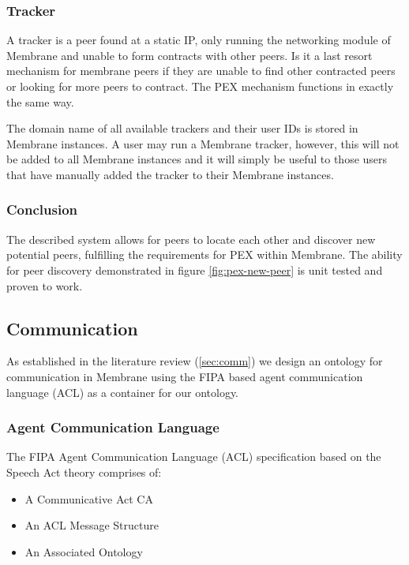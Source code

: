 \documentclass[11pt, a4paper, twocolumn, twoside]{report}
\begin{document}
\subsubsection{Tracker}

A tracker is a peer found at a static IP, only running the networking module of Membrane and unable to form contracts with other peers. Is it a last resort mechanism for membrane peers if they are unable to find other contracted peers or looking for more peers to contract. The PEX mechanism functions in exactly the same way.

The domain name of all available trackers and their user IDs is stored in Membrane instances. A user may run a Membrane tracker, however, this will not be added to all Membrane instances and it will simply be useful to those users that have manually added the tracker to their Membrane instances.

\subsubsection{Conclusion}

The described system allows for peers to locate each other and discover new potential peers, fulfilling the requirements for PEX within Membrane. The ability for peer discovery demonstrated in figure \ref{fig:pex-new-peer} is unit tested and proven to work.

\subsection{Communication}

As established in the literature review (\ref{sec:comm}) we design an ontology for communication in Membrane using the FIPA based agent communication language (ACL) as a container for our ontology.

\subsubsection{Agent Communication Language}

The FIPA Agent Communication Language (ACL) specification based on the Speech Act theory \citep{labrou1999agent} comprises of:

\begin{itemize}
 \item A Communicative Act CA
 \item An ACL Message Structure
 \item An Associated Ontology
\end{itemize}
\end{document}
